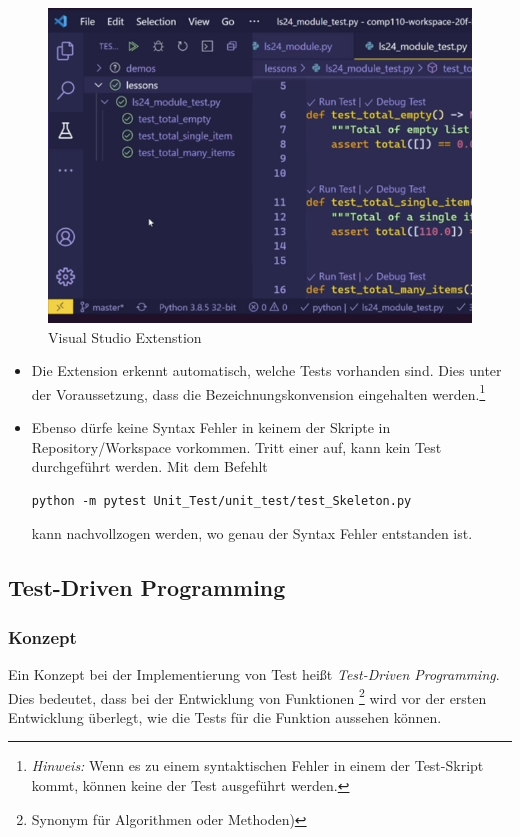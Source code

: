 \begin{figure}[H]
	\centering
	\includegraphics[scale = 0.6]{attachment/chapter_2/Scc082}
	\caption{Visual Studio Extenstion}
\end{figure}

\begin{itemize}
	\item Die Extension erkennt automatisch, welche Tests vorhanden sind. Dies unter der Voraussetzung, dass die Bezeichnungskonvension eingehalten werden.\footnote{
 \textit{Hinweis:} Wenn es zu einem syntaktischen Fehler in einem der Test-Skript kommt, können keine der Test ausgeführt werden.
}
\item Ebenso dürfe keine Syntax Fehler in keinem der Skripte in Repository/Workspace vorkommen. Tritt einer auf, kann kein Test durchgeführt werden. Mit dem Befehlt

\begin{lstlisting}[style=CMD, caption={Unit Test - Version 1; Skeleton-test.py}, captionpos=b]
python -m pytest Unit_Test/unit_test/test_Skeleton.py
\end{lstlisting}
 kann nachvollzogen werden, wo genau der Syntax Fehler entstanden ist.
\end{itemize}

\subsection{Test-Driven Programming}
\subsubsection{Konzept}
Ein Konzept bei der Implementierung von Test heißt \textit{Test-Driven Programming}. Dies bedeutet, dass bei der Entwicklung von Funktionen \footnote{
	 Synonym für Algorithmen oder Methoden)
} wird vor der ersten Entwicklung überlegt, wie die Tests für die Funktion aussehen können.

